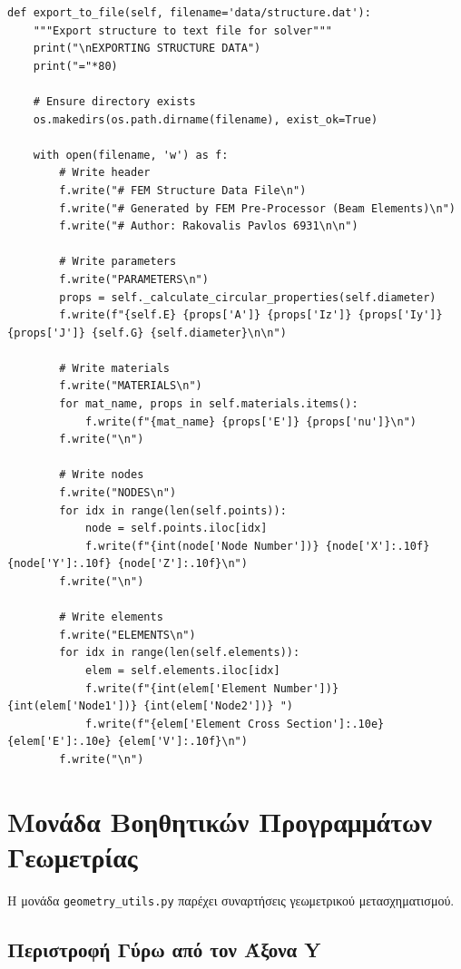 \documentclass[12pt,a4paper]{article}
\begin{document}
\begin{lstlisting}[caption={Εξαγωγή σε Αρχείο DAT}]
def export_to_file(self, filename='data/structure.dat'):
    """Export structure to text file for solver"""
    print("\nEXPORTING STRUCTURE DATA")
    print("="*80)
    
    # Ensure directory exists
    os.makedirs(os.path.dirname(filename), exist_ok=True)
    
    with open(filename, 'w') as f:
        # Write header
        f.write("# FEM Structure Data File\n")
        f.write("# Generated by FEM Pre-Processor (Beam Elements)\n")
        f.write("# Author: Rakovalis Pavlos 6931\n\n")
        
        # Write parameters
        f.write("PARAMETERS\n")
        props = self._calculate_circular_properties(self.diameter)
        f.write(f"{self.E} {props['A']} {props['Iz']} {props['Iy']} {props['J']} {self.G} {self.diameter}\n\n")
        
        # Write materials
        f.write("MATERIALS\n")
        for mat_name, props in self.materials.items():
            f.write(f"{mat_name} {props['E']} {props['nu']}\n")
        f.write("\n")
        
        # Write nodes
        f.write("NODES\n")
        for idx in range(len(self.points)):
            node = self.points.iloc[idx]
            f.write(f"{int(node['Node Number'])} {node['X']:.10f} {node['Y']:.10f} {node['Z']:.10f}\n")
        f.write("\n")
        
        # Write elements
        f.write("ELEMENTS\n")
        for idx in range(len(self.elements)):
            elem = self.elements.iloc[idx]
            f.write(f"{int(elem['Element Number'])} {int(elem['Node1'])} {int(elem['Node2'])} ")
            f.write(f"{elem['Element Cross Section']:.10e} {elem['E']:.10e} {elem['V']:.10f}\n")
        f.write("\n")
\end{lstlisting}

\section{Μονάδα Βοηθητικών Προγραμμάτων Γεωμετρίας}

Η μονάδα \texttt{geometry\_utils.py} παρέχει συναρτήσεις γεωμετρικού μετασχηματισμού.

\subsection{Περιστροφή Γύρω από τον Άξονα Y}
\end{document}
